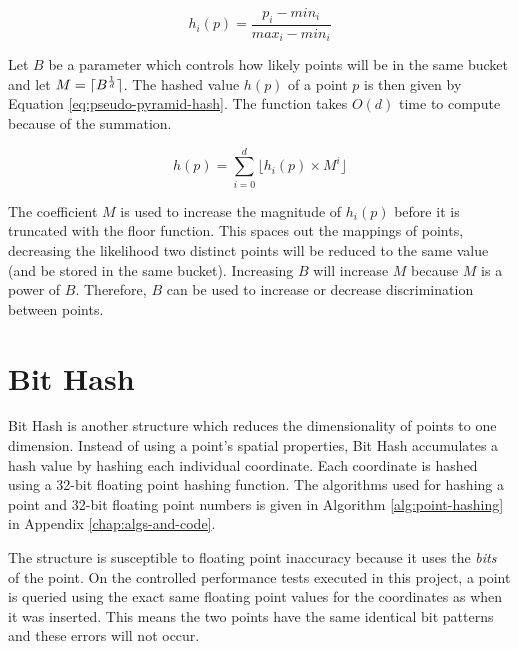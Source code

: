 \begin{equation}
	h_i(p) = \frac{p_i - min_i}{max_i - min_i}
	\label{eq:point-boundary-distance}
\end{equation}

Let $B$ be a parameter which controls how likely points will be in the same bucket and let $M = \lceil B^{\frac{1}{d}}\rceil$. The hashed value $h(p)$ of a point $p$ is then given by Equation \ref{eq:pseudo-pyramid-hash}. The function takes $O(d)$ time to compute because of the summation.

\begin{equation}
	h(p) = \sum_{i = 0}^{d} { \lfloor h_i(p) \times M^{i} \rfloor }
	\label{eq:pseudo-pyramid-hash}
\end{equation}

The coefficient $M$ is used to increase the magnitude of $h_i(p)$ before it is truncated with the floor function. This spaces out the mappings of points, decreasing the likelihood two distinct points will be reduced to the same value (and be stored in the same bucket). Increasing $B$ will increase $M$ because $M$ is a power of $B$. Therefore, $B$ can be used to increase or decrease discrimination between points.

\section{Bit Hash}
\label{sec:bit-hash}


Bit Hash is another structure which reduces the dimensionality of points to one dimension. Instead of using a point's spatial properties, Bit Hash accumulates a hash value by hashing each individual coordinate. Each coordinate is hashed using a  32-bit floating point hashing function. The algorithms used for hashing a point and 32-bit floating point numbers is given in Algorithm \ref{alg:point-hashing} in Appendix \ref{chap:algs-and-code}.

The structure is susceptible to floating point inaccuracy because it uses the \textit{bits} of the point. On the controlled performance tests executed in this project, a point is queried using the exact same floating point values for the coordinates as when it was inserted. This means the two points have the same identical bit patterns and these errors will not occur.

